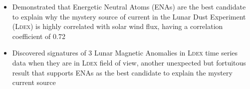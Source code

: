 \documentclass[12pt,a4paper,sans]{moderncv} %
\begin{document}
{\begin{itemize}
\item Demonstrated that Energetic Neutral Atoms (ENAs) are the best candidate to explain why the mystery source of current in the Lunar Dust Experiment (\textsc{Ldex}) is highly correlated with solar wind flux, having a correlation coefficient of 0.72 %
\item Discovered signatures of 3 Lunar Magnetic Anomalies in \textsc{Ldex} time series data when they are in \textsc{Ldex} field of view, another unexpected but fortuitous result that supports ENAs as the best candidate to explain the mystery current source %
\end{itemize}
}
\end{document}
